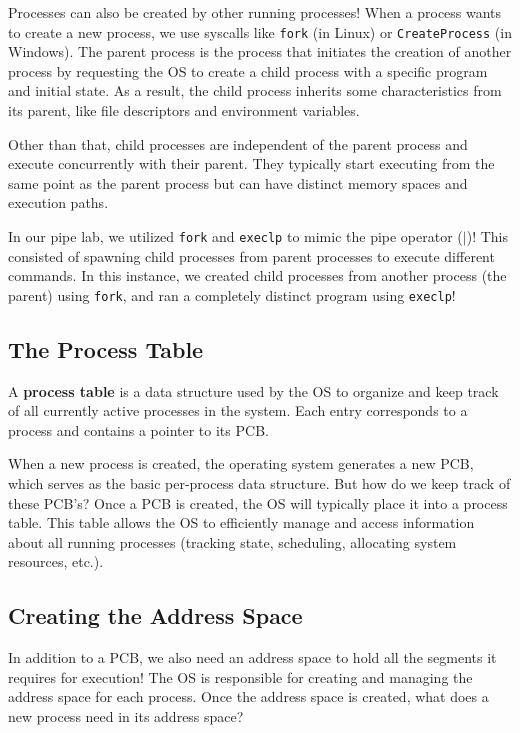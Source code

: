 \documentclass{report}
\newcommand{\definitionBegin}[1]{\begin{tcolorbox}[title={Definition: #1}]}
\newcommand{\definitionEnd}{\end{tcolorbox}}
\newcommand{\exampleBegin}[1]{\begin{tcolorbox}[colback=blue!5!white,colframe=black!75!blue,title={Example:
      #1}]}
\newcommand{\exampleEnd}{\end{tcolorbox}}
\begin{document}
Processes can also be created by other running processes! When a process wants to create a new
process, we use syscalls like \texttt{fork} (in Linux) or \texttt{CreateProcess} (in Windows). The
parent process is the process that initiates the creation of another process by requesting the OS to
create a child process with a specific program and initial state. As a result, the child process
inherits some characteristics from its parent, like file descriptors and environment variables. 

Other than that, child processes are independent of the parent process and execute concurrently with
their parent. They typically start executing from the same point as the parent process but can have
distinct memory spaces and execution paths. 

\exampleBegin{Pipe Up!}
In our pipe lab, we utilized \texttt{fork} and \texttt{execlp} to mimic the pipe operator ($|$)!
This consisted of spawning child processes from parent processes to execute different commands. In
this instance, we created child processes from another process (the parent) using \texttt{fork}, and
ran a completely distinct program using \texttt{execlp}!
\exampleEnd


\subsection{The Process Table}
\definitionBegin{Process Table}
A \textbf{process table} is a data structure used by the OS to organize and keep track of all
currently active processes in the system. Each entry corresponds to a process and contains a pointer
to its PCB.
\definitionEnd

When a new process is created, the operating system generates a new PCB, which serves as the basic
per-process data structure. But how do we keep track of these PCB's? Once a PCB is created, the OS
will typically place it into a process table. This table allows the OS to efficiently manage and
access information about all running processes (tracking state, scheduling, allocating system
resources, etc.). 


\subsection{Creating the Address Space}
In addition to a PCB, we also need an address space to hold all the segments it requires for
execution! The OS is responsible for creating and managing the address space for each process. Once
the address space is created, what does a new process need in its address space?
\end{document}
